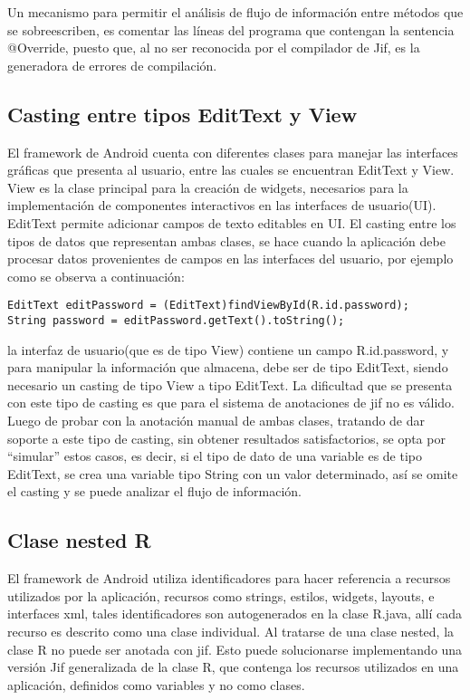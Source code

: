 Un mecanismo para permitir el análisis de flujo de información entre métodos
que se sobreescriben, es comentar las líneas del programa que contengan la
sentencia @Override, puesto que, al no ser reconocida por el compilador de Jif,
es la generadora de errores de compilación.

\subsection{Casting entre tipos EditText y View}
\label{sec:casting}
El framework de Android cuenta con diferentes clases para manejar las interfaces
gráficas que presenta al usuario, entre las cuales se encuentran EditText y
View.\newline
View es la clase principal para la creación de widgets, necesarios para la
implementación de componentes interactivos en las interfaces de
usuario(UI).\newline 
EditText permite adicionar campos de texto editables en UI.\newline
El casting entre los tipos de datos que representan ambas clases, se hace cuando la aplicación debe
procesar datos provenientes de campos en las interfaces del usuario, por ejemplo
como se observa a continuación:
\begin{lstlisting}
EditText editPassword = (EditText)findViewById(R.id.password);
String password = editPassword.getText().toString();
\end{lstlisting}
la interfaz de usuario(que es de tipo View) contiene un campo R.id.password, y
para manipular la información que almacena, debe ser de tipo EditText, siendo
necesario un casting de tipo View a tipo EditText. La dificultad que se presenta
con este tipo de casting es que para el sistema de anotaciones de jif no es
válido. Luego de probar con la anotación manual de ambas clases, tratando de
dar soporte a este tipo de casting, sin obtener resultados satisfactorios, se
opta por ``simular'' estos casos, es decir, si el tipo de dato de una variable
es de tipo EditText, se crea una variable tipo String con un valor determinado,
así se omite el casting y se puede analizar el flujo de información.

\subsection{Clase nested R}
\label{sec:nested}
El framework de Android utiliza identificadores para hacer referencia a recursos
utilizados por la aplicación, recursos como strings, estilos, widgets, layouts, e
interfaces xml, tales identificadores son autogenerados en la clase R.java, allí
cada recurso es descrito como una clase individual. Al tratarse de una clase
nested, la clase R no puede ser anotada con jif. Esto puede solucionarse
implementando una versión Jif generalizada de la clase R, que contenga los
recursos utilizados en una aplicación, definidos como variables y no como clases.

